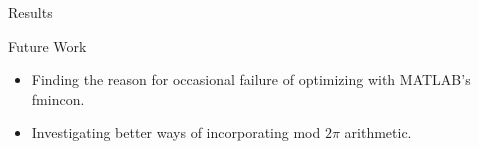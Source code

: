 \documentclass[final]{beamer}
\begin{document}
\begin{frame}{}
{\begin{columns}[t]
\begin{column}{.30\linewidth}
\begin{block}{\centering Results}
\end{block}



                
                
\begin{block}{\centering Future Work}
\begin{itemize}
		\setlength{\itemindent}{0.32in}
	\item Finding the reason for occasional failure of optimizing with MATLAB's fmincon.
	\item Investigating better ways of incorporating mod $2\pi$ arithmetic.
\end{itemize}
\end{block}
                
                

%                       
                

                    
                       
                    
                

\end{column}
\end{columns}}
\end{frame}
\end{document}
